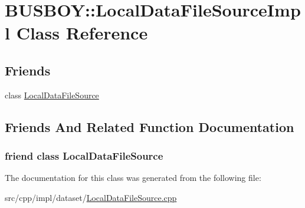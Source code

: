 \hypertarget{classBUSBOY_1_1LocalDataFileSourceImpl}{
\section{BUSBOY::LocalDataFileSourceImpl Class Reference}
\label{classBUSBOY_1_1LocalDataFileSourceImpl}
}
\subsection*{Friends}
\begin{DoxyCompactItemize}
\item 
class \hyperlink{classBUSBOY_1_1LocalDataFileSourceImpl_a5ee443ed74d495f2644896c23c2690d4}{LocalDataFileSource}
\end{DoxyCompactItemize}


\subsection{Friends And Related Function Documentation}
\hypertarget{classBUSBOY_1_1LocalDataFileSourceImpl_a5ee443ed74d495f2644896c23c2690d4}{
\subsubsection[{LocalDataFileSource}]{\setlength{\rightskip}{0pt plus 5cm}friend class {\bf LocalDataFileSource}}}
\label{classBUSBOY_1_1LocalDataFileSourceImpl_a5ee443ed74d495f2644896c23c2690d4}


The documentation for this class was generated from the following file:\begin{DoxyCompactItemize}
\item 
src/cpp/impl/dataset/\hyperlink{LocalDataFileSource_8cpp}{LocalDataFileSource.cpp}\end{DoxyCompactItemize}
